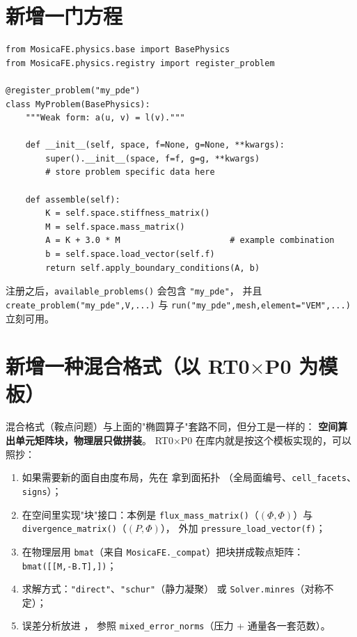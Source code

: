 \documentclass[UTF8,11pt,oneside]{ctexbook}
\theoremstyle{definition}
\theoremstyle{plain}
\newcommand{\code}[1]{\texttt{#1}}
\begin{document}
\section{新增一门方程}

\begin{lstlisting}[language=MosicaFE,caption={示例 12.2：新 PDE 模板},label={lst:newpde}]
from MosicaFE.physics.base import BasePhysics
from MosicaFE.physics.registry import register_problem

@register_problem("my_pde")
class MyProblem(BasePhysics):
    """Weak form: a(u, v) = l(v)."""

    def __init__(self, space, f=None, g=None, **kwargs):
        super().__init__(space, f=f, g=g, **kwargs)
        # store problem specific data here

    def assemble(self):
        K = self.space.stiffness_matrix()
        M = self.space.mass_matrix()
        A = K + 3.0 * M                      # example combination
        b = self.space.load_vector(self.f)
        return self.apply_boundary_conditions(A, b)
\end{lstlisting}

注册之后，\code{available\_\allowbreak problems()} 会包含 \code{"my\_\allowbreak pde"}，
并且 \code{create\_\allowbreak problem("my\_\allowbreak pde",\allowbreak  V,\allowbreak  ...)} 与
\code{run("my\_\allowbreak pde",\allowbreak  mesh,\allowbreak  element="VEM",\allowbreak  ...)} 立刻可用。

\section{新增一种混合格式（以 RT0$\times$P0 为模板）}

混合格式（鞍点问题）与上面的"椭圆算子"套路不同，但分工是一样的：
\textbf{空间算出单元矩阵块，物理层只做拼装}。
RT0$\times$P0 在库内就是按这个模板实现的，可以照抄：

\begin{enumerate}[label=(\arabic*),itemsep=0.2em]
  \item 如果需要新的面自由度布局，先在  拿到面拓扑
        （全局面编号、\code{cell\_\allowbreak facets}、\code{signs}）；
  \item 在空间里实现"块"接口：本例是
        \code{flux\_\allowbreak mass\_\allowbreak matrix()}（$(\Phi,\Phi)$）与
        \code{divergence\_\allowbreak matrix()}（$(P,\Phi)$），
        外加 \code{pressure\_\allowbreak load\_\allowbreak vector(f)}；
  \item 在物理层用 \code{bmat}（来自 \code{MosicaFE.\_\allowbreak compat}）把块拼成鞍点矩阵：
        \code{bmat([[M,\allowbreak  -B.T],\allowbreak  [B,\allowbreak  None]])}；
  \item 求解方式：\code{"direct"}、\code{"schur"}（静力凝聚）
        或 \code{Solver.minres}（对称不定）；
  \item 误差分析放进 ，
        参照 \code{mixed\_\allowbreak error\_\allowbreak norms}（压力 + 通量各一套范数）。
\end{enumerate}
\end{document}
